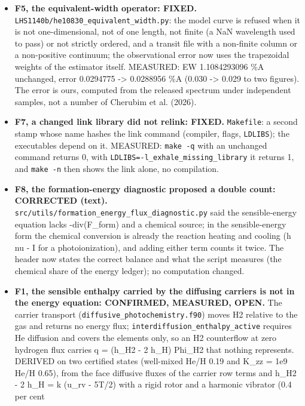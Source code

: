 \documentclass[english,a4paper]{my_memo}
\begin{document}
\begin{itemize}
  MEASURED on the molecular K\_zz = 1e9 He/H 2.13 catalog output: every
  number of the five \texttt{tpm\_*} files is identical before and after.
\item
  \textbf{F5, the equivalent-width operator: FIXED.}
  \texttt{LHS1140b/he10830\_equivalent\_width.py}: the model curve is refused when
  it is not one-dimensional, not of one length, not finite (a NaN
  wavelength used to pass) or not strictly ordered, and a transit file
  with a non-finite column or a non-positive continuum; the observational
  error now uses the trapezoidal weights of the estimator itself.
  MEASURED: EW 1.1084293096 \%A unchanged, error 0.0294775 -\textgreater{} 0.0288956 \%A
  (0.030 -\textgreater{} 0.029 to two figures). The error is ours, computed from the
  released spectrum under independent samples, not a number of Cherubim et
  al. (2026).
\item
  \textbf{F7, a changed link library did not relink: FIXED.} \texttt{Makefile}: a
  second stamp whose name hashes the link command (compiler, flags,
  \texttt{LDLIBS}); the executables depend on it. MEASURED: \texttt{make\ -q} with an
  unchanged command returns 0, with \texttt{LDLIBS=-l\_exhale\_missing\_library} it
  returns 1, and \texttt{make\ -n} then shows the link alone, no compilation.
\item
  \textbf{F8, the formation-energy diagnostic proposed a double count:
  CORRECTED (text).} \texttt{src/utils/formation\_energy\_flux\_diagnostic.py}
  said the sensible-energy equation lacks -div(F\_form) and a chemical
  source; in the sensible-energy form the chemical conversion is already
  the reaction heating and cooling (h nu - I for a photoionization), and
  adding either term counts it twice. The header now states the correct
  balance and what the script measures (the chemical share of the energy
  ledger); no computation changed.
\item
  \textbf{F1, the sensible enthalpy carried by the diffusing carriers is not in
  the energy equation: CONFIRMED, MEASURED, OPEN.} The carrier transport
  (\texttt{diffusive\_photochemistry.f90}) moves H2 relative to the gas and returns
  no energy flux; \texttt{interdiffusion\_enthalpy\_active} requires He diffusion and
  covers the elements only, so an H2 counterflow at zero hydrogen flux
  carries q = (h\_H2 - 2 h\_H) Phi\_H2 that nothing represents. DERIVED on two
  certified states (well-mixed He/H 0.19 and K\_zz = 1e9 He/H 0.65), from the
  face diffusive fluxes of the carrier row terms and h\_H2 - 2 h\_H =
  k (u\_rv - 5T/2) with a rigid rotor and a harmonic vibrator (0.4 per cent

\end{itemize}
\end{document}
